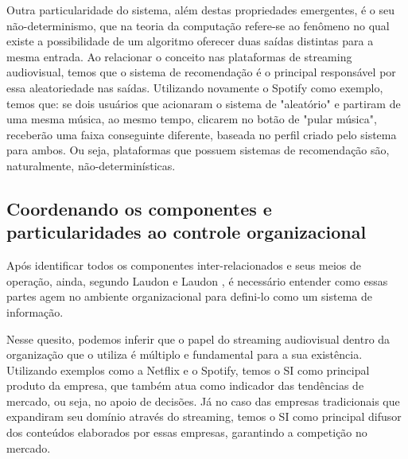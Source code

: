 \documentclass[conference]{IEEEtran}
\begin{document}
Outra particularidade do sistema, além destas propriedades emergentes, é o seu não-determinismo, que na teoria da computação refere-se ao fenômeno no qual existe a possibilidade de um algoritmo oferecer duas saídas distintas para a mesma entrada. Ao relacionar o conceito nas plataformas de streaming audiovisual, temos que o sistema de recomendação é o principal responsável por essa aleatoriedade nas saídas. Utilizando novamente o Spotify como exemplo, temos que: se dois usuários que acionaram o sistema de "aleatório" e partiram de uma mesma música, ao mesmo tempo, clicarem no botão de "pular música", receberão uma faixa conseguinte diferente, baseada no perfil criado pelo sistema para ambos. Ou seja, plataformas que possuem sistemas de recomendação são, naturalmente, não-determinísticas.


\subsection{Coordenando os componentes e particularidades ao controle organizacional}
Após identificar todos os componentes inter-relacionados e seus meios de operação, ainda, segundo Laudon e Laudon \cite{b3}, é necessário entender como essas partes agem no ambiente organizacional para defini-lo como um sistema de informação. 

Nesse quesito, podemos inferir que o papel do streaming audiovisual dentro da organização que o utiliza é múltiplo e fundamental para a sua existência. Utilizando exemplos como a Netflix e o Spotify, temos o SI como principal produto da empresa, que também atua como indicador das tendências de mercado, ou seja, no apoio de decisões. Já no caso das empresas tradicionais que expandiram seu domínio através do streaming, temos o SI como principal difusor dos conteúdos elaborados por essas empresas, garantindo a competição no mercado.
\end{document}
